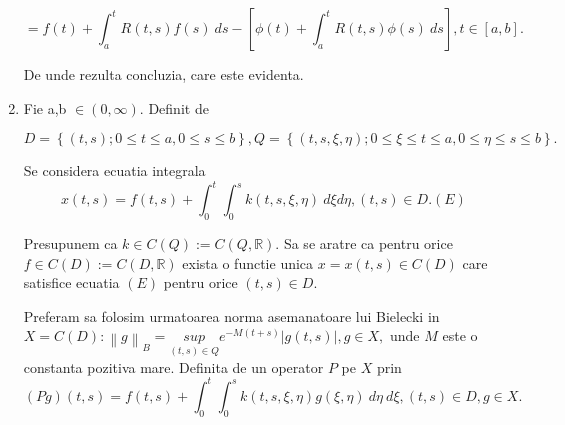 \documentclass[a4paper,12pt,oneside]{report}
\begin{document}
\begin{enumerate}
		      	\begin{displaymath}
		      		= f\left ( t \right ) + \int_{a}^{t} R\left ( t,s \right )f\left ( s \right ) \ ds - \left [ \phi \left ( t \right ) + \int_{a}^{t}R\left ( t,s \right )\phi \left ( s \right ) \ ds \right ], t \in \left [ a,b \right ].
		      	\end{displaymath}
		      			      			      			      			      	
		      			      			      			      			      	 
		      	De unde rezulta concluzia, care este evidenta. 
		      			      			      			      			      		
		      	\item Fie a,b \(\in \left ( 0,\infty  \right )\). Definit de 
		      			      			      			      			      	
		      	\begin{displaymath}
		      		D = \left \{ \left ( t,s \right );0\leq t\leq a, 0\leq s\leq b \right \}, Q = \left \{ \left ( t,s,\xi , \eta  \right );0\leq \xi \leq t\leq a, 0\leq \eta \leq s\leq b \right \}. 		      	
		      	\end{displaymath}
		      			      			      			      	
		      	Se considera ecuatia integrala
		      	\begin{displaymath}
		      		x\left ( t,s \right ) = f\left ( t,s \right ) + \int_{0}^{t}\int_{0}^{s}k\left ( t,s,\xi ,\eta  \right )\ d\xi d\eta , \left ( t,s \right ) \in D. (E)
		      	\end{displaymath}
		      			      			      			      			      	
		      	Presupunem ca \(k \in C\left ( Q \right ):= C\left ( Q,\mathbb{R} \right )\). 
		      	Sa se aratre ca pentru orice \(f \in C\left ( D \right ):= C\left ( D,\mathbb{R} \right )\) exista o functie unica \(x = x\left ( t,s \right ) \in C\left ( D \right )\) care satisfice ecuatia \((E)\) pentru orice \(\left ( t,s \right ) \in D\). 
		      			      			      			      			      	
		      	Preferam sa folosim urmatoarea norma asemanatoare lui Bielecki in \(X = C \left ( D \right ) : 
		      	\left \| g \right \| _{B} = \underset{\left ( t,s \right )\in Q}{sup}e^{-M\left ( t+s \right )}\left | g\left ( t,s \right ) \right |, g\in X,\)
		      	unde \(M\) este o constanta pozitiva mare. Definita de un operator \(P\) pe \(X\) prin 
		      	\begin{displaymath}
		      		\left ( Pg \right )\left ( t,s \right ) = f\left ( t,s \right ) + \int_{0}^{t}\int_{0}^{s}k\left ( t,s,\xi ,\eta  \right )g\left ( \xi ,\eta  \right ) \ d\eta  \ d\xi , \left ( t,s \right ) \in D, g \in X.
		      	\end{displaymath}
		      			      			      			      			      	

\end{enumerate}
\end{document}
